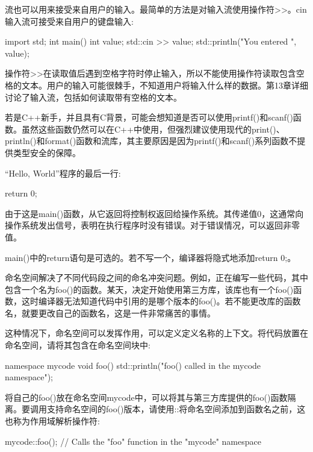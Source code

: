 流也可以用来接受来自用户的输入。最简单的方法是对输入流使用操作符>{}>。cin输入流可接受来自用户的键盘输入:

\begin{cpp}
import std;
int main()
{
    int value;
    std::cin >> value;
    std::println("You entered {}", value);
}
\end{cpp}

操作符>{}>在读取值后遇到空格字符时停止输入，所以不能使用操作符读取包含空格的文本。用户的输入可能很棘手，不知道用户将输入什么样的数据。第13章详细讨论了输入流，包括如何读取带有空格的文本。

若是C++新手，并且具有C背景，可能会想知道是否可以使用printf()和scanf()函数。虽然这些函数仍然可以在C++中使用，但强烈建议使用现代的print()、println()和format()函数和流库，其主要原因是因为printf()和scanf()系列函数不提供类型安全的保障。


“Hello, World”程序的最后一行:

\begin{cpp}
return 0;
\end{cpp}

由于这是main()函数，从它返回将控制权返回给操作系统。其传递值0，这通常向操作系统发出信号，表明在执行程序时没有错误。对于错误情况，可以返回非零值。

main()中的return语句是可选的。若不写一个，编译器将隐式地添加return 0;。


命名空间解决了不同代码段之间的命名冲突问题。例如，正在编写一些代码，其中包含一个名为foo()的函数。某天，决定开始使用第三方库，该库也有一个foo()函数，这时编译器无法知道代码中引用的是哪个版本的foo()。若不能更改库的函数名，就要更改自己的函数名，这是一件非常痛苦的事情。

这种情况下，命名空间可以发挥作用，可以定义定义名称的上下文。将代码放置在命名空间，请将其包含在命名空间块中:

\begin{cpp}
namespace mycode {
    void foo()
    {
        std::println("foo() called in the mycode namespace");
    }
}
\end{cpp}

将自己的foo()放在命名空间mycode中，可以将其与第三方库提供的foo()函数隔离。要调用支持命名空间的foo()版本，请使用::将命名空间添加到函数名之前，这也称为作用域解析操作符:

\begin{cpp}
mycode::foo(); // Calls the "foo" function in the "mycode" namespace
\end{cpp}

